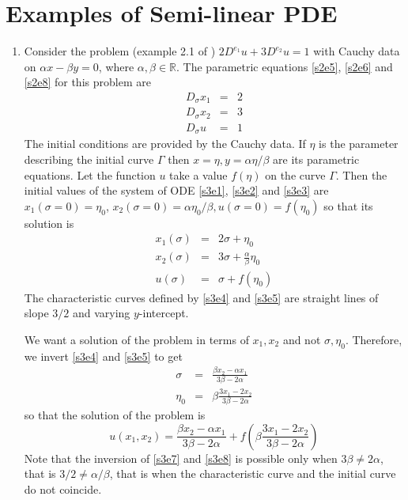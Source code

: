 \documentclass{article}
\theoremstyle{plain}
\numberwithin{thm}{section}
\theoremstyle{plain}
\numberwithin{prop}{section}
\theoremstyle{definition}
\numberwithin{defn}{section}
\theoremstyle{remark}
\numberwithin{equation}{section}
\begin{document}
\section{Examples of Semi-linear PDE}\label{s3}
\begin{enumerate}
\item Consider the problem (example 2.1 of \cite{pprr}) $2D^{e_1}u + 3D^{e_2}u = 1$ with Cauchy data
on $\alpha x - \beta y = 0$, where $\alpha, \beta \in \mathbb{R}$. The parametric equations 
\eqref{s2e5}, \eqref{s2e6} and \eqref{s2e8} for this problem are
\begin{eqnarray}
D_\sigma x_1 &=& 2 \label{s3e1} \\
D_\sigma x_2 &=& 3 \label{s3e2} \\
D_\sigma u &=& 1 \label{s3e3} 
\end{eqnarray}
The initial conditions are provided by the Cauchy data. If $\eta$ is the parameter describing the
initial curve $\Gamma$ then $x = \eta, y = \alpha\eta/\beta$ are its parametric equations. Let the
function $u$ take a value $f(\eta)$ on the curve $\Gamma$. Then the initial values of the system of 
ODE \eqref{s3e1}, \eqref{s3e2} and \eqref{s3e3} are $x_1(\sigma = 0) = \eta_0$, $x_2(\sigma = 0) = 
\alpha\eta_0/\beta, u(\sigma = 0) = f(\eta_0)$ so that its solution is
\begin{eqnarray}
x_1(\sigma) &=& 2\sigma + \eta_0 \label{s3e4} \\
x_2(\sigma) &=& 3\sigma + \frac{\alpha}{\beta}\eta_0 \label{s3e5} \\
u(\sigma) &=& \sigma + f(\eta_0) \label{s3e6}
\end{eqnarray}
The characteristic curves defined by \eqref{s3e4} and \eqref{s3e5} are straight lines of slope $3/2$ 
and varying $y$-intercept.

We want a solution of the problem in terms of $x_1, x_2$ and not $\sigma, \eta_0$. Therefore, we 
invert \eqref{s3e4} and \eqref{s3e5} to get
\begin{eqnarray}
\sigma &=& \frac{\beta x_2 - \alpha x_1}{3\beta - 2\alpha} \label{s3e7} \\
\eta_0 &=& \beta\frac{3x_1 - 2x_2}{3\beta - 2\alpha} \label{s3e8}
\end{eqnarray}
so that the solution of the problem is
\begin{equation}\label{s3e9}
u(x_1, x_2) = \frac{\beta x_2 - \alpha x_1}{3\beta - 2\alpha} +
 f\left(\beta\frac{3x_1 - 2x_2}{3\beta - 2\alpha}\right)
\end{equation}
Note that the inversion of \eqref{s3e7} and \eqref{s3e8} is possible only when $3\beta \ne 2\alpha$,
that is $3/2 \ne \alpha/\beta$, that is when the characteristic curve and the initial curve do not
coincide.


\end{enumerate}
\end{document}
